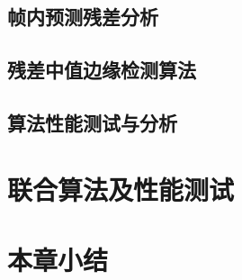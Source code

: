 \subsection{帧内预测残差分析}


\subsection{残差中值边缘检测算法}

\subsection{算法性能测试与分析}


\section{联合算法及性能测试}

\section{本章小结}